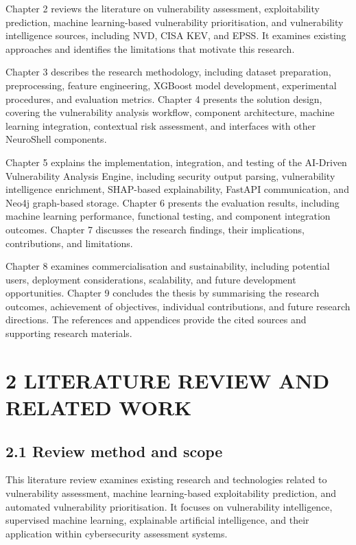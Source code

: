 \documentclass[
]{article}
\begin{document}
Chapter 2 reviews the literature on vulnerability assessment,
exploitability prediction, machine learning-based vulnerability
prioritisation, and vulnerability intelligence sources, including NVD,
CISA KEV, and EPSS. It examines existing approaches and identifies the
limitations that motivate this research.

Chapter 3 describes the research methodology, including dataset
preparation, preprocessing, feature engineering, XGBoost model
development, experimental procedures, and evaluation metrics. Chapter 4
presents the solution design, covering the vulnerability analysis
workflow, component architecture, machine learning integration,
contextual risk assessment, and interfaces with other NeuroShell
components.

Chapter 5 explains the implementation, integration, and testing of the
AI-Driven Vulnerability Analysis Engine, including security output
parsing, vulnerability intelligence enrichment, SHAP-based
explainability, FastAPI communication, and Neo4j graph-based storage.
Chapter 6 presents the evaluation results, including machine learning
performance, functional testing, and component integration outcomes.
Chapter 7 discusses the research findings, their implications,
contributions, and limitations.

Chapter 8 examines commercialisation and sustainability, including
potential users, deployment considerations, scalability, and future
development opportunities. Chapter 9 concludes the thesis by summarising
the research outcomes, achievement of objectives, individual
contributions, and future research directions. The references and
appendices provide the cited sources and supporting research materials.

\hypertarget{literature-review-and-related-work}{%
\section{2 LITERATURE REVIEW AND RELATED
WORK}\label{literature-review-and-related-work}}

\hypertarget{review-method-and-scope}{%
\subsection{2.1 Review method and scope}\label{review-method-and-scope}}

This literature review examines existing research and technologies
related to vulnerability assessment, machine learning-based
exploitability prediction, and automated vulnerability prioritisation.
It focuses on vulnerability intelligence, supervised machine learning,
explainable artificial intelligence, and their application within
cybersecurity assessment systems.
\end{document}
